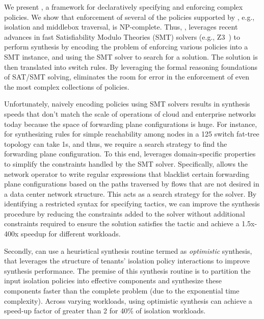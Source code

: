 We present \Name, a framework for declaratively specifying and
enforcing complex policies.  We show that enforcement of several of
the policies supported by \Name, e.g., isolation and middlebox
traversal, is NP-complete. Thus, \Name, leverages recent advances in
fast Satisfiability Modulo Theories (SMT) solvers (e.g., Z3~\cite{z3})
to perform synthesis by encoding the problem of enforcing various
policies into a SMT instance, and using the SMT solver to search for a
solution. The solution is then translated into switch rules. %
By leveraging the formal reasoning foundations of SAT/SMT solving,
\Name eliminates the room for error in the enforcement of even the
most complex collections of policies.

Unfortunately, naively encoding policies using SMT solvers results in
synthesis speeds that don't match the scale of operations of cloud and
enterprise networks today because the space of forwarding plane configurations
is huge. For instance, for synthesizing rules for simple
reachability among nodes in a 125 switch fat-tree topology can take
1s, and thus, we require a search strategy to find the forwarding plane
configuration.  To this
end, \Name leverages domain-specific properties to simplify the
constraints handled by the SMT solver.  Specifically, \Name allows the
network operator to write regular expressions that blacklist certain
forwarding plane configurations based on the paths traversed by flows  
that are not desired in a data center network structure. This acts as a
search strategy for the solver. 
By identifying a restricted syntax for specifying
tactics, we can improve the synthesis procedure by reducing the
constraints added to the solver without additional constraints
required to ensure the solution satisfies the tactic and achieve
a 1.5x-400x speedup for different workloads.

 Secondly, \Name can use a heuristical synthesis routine termed as
 \emph{optimistic} synthesis, that leverages the structure of tenants'
 isolation policy interactions to improve synthesis performance. The
 premise of this synthesis routine is to partition the input isolation
 policies into effective components and synthesize these components
 faster than the complete problem (due to the exponential time
 complexity). Across varying workloads, using optimistic synthesis can
 achieve a speed-up factor of greater than 2 for 40\% of isolation workloads.  

